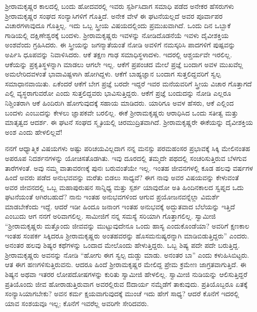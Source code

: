  ಶ‍್ರೀರಾಮಕೃಷ್ಣರ ಕಾಲದಲ್ಲಿ ಬಂದು ಹೋದವರಲ್ಲಿ ಇವರು ಸ್ಪರ್ಶಿಸಿದಾಗ ಸಮಾಧಿ ಪಡೆದ ಅನೇಕರ ಹೆಸರುಗಳು ಶ‍್ರೀರಾಮಕೃಷ್ಣರ ಸಂಘದ ಸಂನ್ಯಾಸಿಗಳಿಗೆ ಗೊತ್ತಿದೆ. ಅನೇಕ ವೇಳೆ ಈ ಘಟನೆಯಲ್ಲದೆ ಅವರ ಪೂರ್ವಾಪರ ವಿಚಾರಗಳಾವುದೂ ಗೊತ್ತಿಲ್ಲ. ಇದು ಒಬ್ಬ ಸ್ತ್ರೀಯ ವಿಷಯದಲ್ಲಿಂದು ಪ್ರಮುಖವಾಗಿದೆ. ಒಂದು ದಿನ ಒಬ್ಬಾಕೆ ಗಾಡಿಯಲ್ಲಿ ದಕ್ಷಿಣೇಶ್ವರಕ್ಕೆ ಬಂದಳು. ಶ‍್ರೀರಾಮಕೃಷ್ಣರು ಇವಳನ್ನು ನೋಡಿದೊಡನೆಯೆ ಇವಳು ದೈವೀಶಕ್ತಿಯ ಅಂಶವೆಂದು ಗ್ರಹಿಸಿದರು. ಈ ಸ್ತ್ರೀಯನ್ನು ಜಗನ್ಮಾತೆಯಂತೆ ನೋಡಿ ಅವಳಿಗೆ ನಮಸ್ಕರಿಸಿ ಪಾದಗಳಿಗೆ ಪುಷ್ಪವನ್ನು ಅರ್ಪಿಸಿ ಧೂಪವನ್ನು ನಿವಾಳಿಸಿದರು. ಆಕೆ ತಕ್ಷಣ ಗಾಢ ಸಮಾಧಿಸ್ಥಳಾದಳು. ಇದರಲ್ಲಿ ಆಶ್ಚರ್ಯವೇ ಇರಲಿಲ್ಲ. ಆಕೆಯನ್ನು ಪ್ರಕೃತಿಸ್ಥಳನ್ನಾಗಿ ಮಾಡಲು ಆಗಲೇ ಇಲ್ಲ. ಆಕೆಗೆ ಪ್ರಪಂಚದ ಮೇಲೆ ಪ್ರಜ್ಞೆ ಬಂದಾಗ ಅವಳ ಮುಖವೆಲ್ಲ ಅಮಲೇರಿದವಳಂತೆ ಭಾವಾವಿಷ್ಟಳಾಗಿ ಹೋಗಿದ್ದಳು. ಆಕೆಗೆ ಬಾಹ್ಯಜ್ಞಾನ ಬಂದಾಗ ಸುತ್ತಲಿದ್ದವರಿಗೆ ಸ್ವಲ್ಪ ಸಮಾಧಾನವಾಯಿತು. ಏಕೆಂದರೆ ಆಕೆಗೆ ಬೇಗ ಪ್ರಜ್ಞೆ ಬರದೇ ಇದ್ದರೆ ಇವರ ಮನೆಯವರಿಗೆ ಸ್ತ್ರೀಯ ವಿಚಾರ ಗೊತ್ತಾಗದೆ ಎಲ್ಲಿ ವ್ಯಸ್ಥರಾಗುವರೋ ಎಂದು ಸುತ್ತಲಿದ್ದವರು ಭಾವಿಸುತ್ತಿದ್ದರು. ಆಕೆಗೆ ಪ್ರಜ್ಞೆ ಬಂದುದನ್ನು ನೋಡಿ ಎಲ್ಲರೂ ನಿಶ್ಚಿಂತರಾಗಿ ಆಕೆ ಹಿಂದಿರುಗಿ ಹೋಗುವುದಕ್ಕೆ ಸಹಾಯ ಮಾಡಿದರು. ಯಾರಿಗೂ ಅವಳ ಹೆಸರು, ಆಕೆ ಎಲ್ಲಿಂದ ಬಂದಳು ಎಂಬುದನ್ನು ಕೇಳಲು ಜ್ಞಾಪಕವೇ ಬರಲಿಲ್ಲ. ಈಕೆ ಶ‍್ರೀರಾಮಕೃಷ್ಣರು ಆರಾಧಿಸಿದ ಒಂದು ಸತೀತ್ವ ಮತ್ತು ಮಾತೃತ್ವದ ಆದರ್ಶ. ಈ ಘಟನೆ ಸಂಘದ ಸ್ಮೃತಿಯಲ್ಲಿ ಚಿರಮುದ್ರಿತವಾಗಿದೆ. ಶ‍್ರೀರಾಮಕೃಷ್ಣರೇ ಈಕೆಯನ್ನು ದೈವೀಶಕ್ತಿಯ ಅಂಶ ಎಂದು ಹೇಳಲಿಲ್ಲವೆ! 

 ನನಗೆ ಆಧ್ಯಾತ್ಮಿಕ ವಿಷಯಗಳು ಅಷ್ಟು ಪರಿಚಯವಿಲ್ಲದಾಗ ನನ್ನ ಮನಸ್ಸು ಪರಮಹಂಸರ ಪ್ರಭಾವಕ್ಕೆ ಸಿಕ್ಕಿ ಮೇಲಿನಂತಹ ಅಪರೂಪ ನಿದರ್ಶನಗಳನ್ನು ಯೋಚಿಸತೊಡಗಿತು. ಇವು ದೂರದಲ್ಲಿ ತಮ್ಮದೇ ಪಥದಲ್ಲಿ ಸಂಚರಿಸುತ್ತಿರುವ ಬೆಳಗುವ ತಾರೆಗಳಂತೆ. ಅವು ನಮ್ಮ ವಾತಾವರಣಕ್ಕೆ ಪುನಃ ಬರುವಂತೆಯೇ ಇಲ್ಲ. ಇಂತಹ ಜೀವನಗಳಲ್ಲಿ ಕೂಡ ಹಲವು ವರ್ಷಗಳ ಹಿಂದೆ ಅವರು ಪಡೆದ ಅನುಭವವನ್ನು ಮರೆತು ಬಿಡಲು ಸಾಧ್ಯವೆ? ಈಗ ನಾವು ಅವರ ವಿಷಯವನ್ನು ಕೇಳುವಂತೆ ಅವರ ಜೀವನದಲ್ಲಿ ಒಬ್ಬ ಮಹಾಪುರುಷನ ಸಾನ್ನಿಧ್ಯ ಮತ್ತು ಸ್ಪರ್ಶ ಯಾವುದೋ ಅತಿ ಹಿಂದಿನಕಾಲದ ಸ್ವಪ್ನದ ಒದು ಘಟನೆಯಂತೆ ಆಗಿರಬಹುದೆ? ನಾನು ಇಂತಹ ಅನುಭವಗಳಿಂದ ಆಗುವ ಪ್ರಯೋಜನವನ್ನೆಲ್ಲಾ ವಿಮರ್ಶೆ ಮಾಡಬೇಕೆಂದು ಇದ್ದೆ. ಆದರೆ ಇಡೀ ಹಿಂದೂ ಜನಾಂಗ ಇಂತಹ ಅನುಭವಕ್ಕೆ ಅದ್ಭುತವಾದ ಬೆಲೆಯನ್ನು ಇತ್ತಿದೆ ಎಂಬುದು ಆಗ ನನಗೆ ಅರಿವಾಗಲಿಲ್ಲ. ಸಾಮೀಜಿಗೆ ನನ್ನ ಸಮಸ್ಯೆ ಸರಿಯಾಗಿ ಗೊತ್ತಾಗಲಿಲ್ಲ. ಸ್ವಾಮೀಜಿ “ಶ‍್ರೀರಾಮಕೃಷ್ಣರು ಮತ್ತೊಂದು ಜೀವವನ್ನು ಮುಟ್ಟುವುದೇನೂ ಒಂದು ಹಾಸ್ಯ ಎಂದುಕೊಂಡೆಯಾ? ಅವರಿಗೆ ಕ್ಷಣಕಾಲ ಇಂತಹ ಸಂಪರ್ಕ ಸಿಕ್ಕಿದರೂ ಶ‍್ರೀರಾಮಕೃಷ್ಣರು ಅಂತಹವರನ್ನು ಹೊಸಮನುಷ್ಯರನ್ನಾಗಿ ಮಾಡಿಬಿಡುತ್ತಿದ್ದರು” ಎಂದರು. ಅನಂತರ ಹಲವು ಶಿಷ್ಯರ ಕಥೆಗಳನ್ನು ಒಂದಾದ ಮೇಲೊಂದು ಹೇಳುತ್ತಿದ್ದರು. ಒಬ್ಬ ಶಿಷ್ಯ ಪದೇ ಪದೇ ಬರುತ್ತಿದ್ದ. ಶ‍್ರೀರಾಮಕೃಷ್ಣರು ಅವನನ್ನು ನೋಡಿ “ಹೋಗು ಈಗ ಸ್ವಲ್ಪ ದುಡ್ಡು ಮಾಡು. ಅನಂತರ ಬಾ” ಎಂದು ಕಳುಹಿಸಿಬಿಟ್ಟರು. ಆತ ಈಗ ಹಣಗಳಿಸುತ್ತಿರುವನು. ಆದರೂ ಹಿಂದೆ ಶ‍್ರೀರಾಮಕೃಷ್ಣರ ಮೇಲಿದ್ದ ಪ್ರೇಮ ಕ್ರಮೇಣ ಜಾಗ್ರತವಾಗುತ್ತಿದೆ. ಈ ಶಿಷ್ಯನ ಅಥವಾ ಇತರರ ಲೋಪದೋಷಗಳನ್ನು ಕುರಿತು ಸ್ವಾಮೀಜಿ ಹೇಳಲಿಲ್ಲ. ಸ್ವಾಮೀಜಿ ನುಡಿಯನ್ನು ಆಲಿಸುತ್ತಿದ್ದರೆ ಪ್ರತಿಯೊಂದು ಜೀವ ಹೋರಾಡುತ್ತಿರುವಾಗ ಅವರಲ್ಲಿರುವ ಔದಾರ್ಯ ನಮ್ಮೆಡೆಗೆ ತಾಕುವುದು. ಪ್ರತಿಯೊಬ್ಬರೂ ಏತಕ್ಕೆ ಸಂನ್ಯಾಸಿಯಾಗಬೇಕು? ಅವನ ಕರ್ಮ ಕ್ಷಯವಾಗುವುದಕ್ಕೆ ಮುಂಚೆ ಇದು ಹೇಗೆ ಸಾಧ್ಯ? ಆದರೆ ಕೊನೆಗೆ ಇದರಲ್ಲಿ ಯಾವ ಸಂಶಯವೂ ಇಲ್ಲ; ಕೊನೆಗೆ ಇವರೆಲ್ಲ ಅವರಿಗೇ ಸೇರಿದವರು. 

